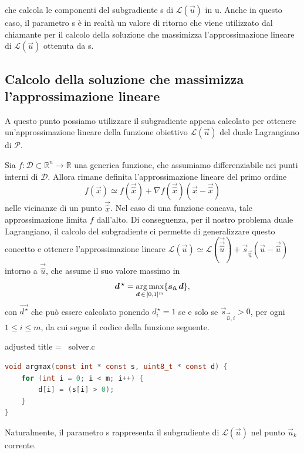 \noindent
che calcola le componenti del subgradiente {\jbm s} di \( \mathcal{L}(\vec{u}) \) in {\jbm u}. Anche in questo caso, il
parametro {\jbm s} è in realtà un valore di ritorno che viene utilizzato dal chiamante per il calcolo
della soluzione che massimizza l'approssimazione lineare di \( \mathcal{L}(\vec{u}) \) ottenuta da {\jbm s}.

\subsection{Calcolo della soluzione che massimizza l'approssimazione lineare}

A questo punto possiamo utilizzare il subgradiente appena calcolato per ottenere un'approssimazione lineare della
funzione obiettivo \( \mathcal{L}(\vec{u}) \) del duale Lagrangiano di \( \mathcal{P} \).

Sia \( f\colon \mathcal{D}\subset\mathbb{R}^n \to \mathbb{R} \) una generica funzione, che assumiamo differenziabile nei
punti interni di \( \mathcal{D} \). Allora rimane definita l'approssimazione lineare del primo ordine
\begin{equation}
    f(\vec{x}) \simeq f(\vec{\hat{x}}) + \nabla f(\vec{\hat{x}})(\vec{x} - \vec{\hat{x}})
\end{equation}
nelle vicinanze di un punto \( \vec{\hat{x}} \). Nel caso di una funzione concava, tale approssimazione limita \( f \)
dall'alto. Di conseguenza, per il nostro problema duale Lagrangiano, il calcolo del subgradiente ci permette di
generalizzare questo concetto e ottenere l'approssimazione lineare \( \mathcal{L}(\vec{u}) \simeq \mathcal{L}(\vec{\vec{\hat{u}}}) +
\vec{s}_{\vec{\hat{u}}}(\vec{u} - \vec{\hat{u}})\) intorno a \( \vec{\hat{u}} \), che assume il suo valore massimo in
\begin{equation}
\bm{d^{\,\star}} = \operatorname*{arg\,max}_{\bm{d}
\,\in\, [0, 1]^m } \{\bm{s}_{\bm{\hat{u}}}\, \bm{d}\},
\end{equation}
con
\(
    \vec{d^{\,\star}}
\)
che può essere calcolato ponendo \( d^{\,\star}_i = 1 \) se e solo se \( \vec{s}_{\vec{\hat{u}},i} > 0 \), per ogni \( 1 \leq i
\leq m \), da cui segue il codice della funzione seguente.

\begin{code}{adjusted title = {\cicon\ solver.c}}
\begin{lstlisting}[language=c, style = style, caption={Calcolo di \( \vec{d}_k = \argmax_{\vec{d} \,\in\, [0, 1]^m}
\,\{\vec{s}_k\,\vec{d}\}\).}]
void argmax(const int * const s, uint8_t * const d) {
    for (int i = 0; i < m; i++) {
        d[i] = (s[i] > 0);
    }
}\end{lstlisting}
\end{code}
\noindent
Naturalmente, il parametro {\jbm s} rappresenta il subgradiente di \( \mathcal{L}(\vec{u}) \) nel punto \( \vec{u}_k \)
corrente.

